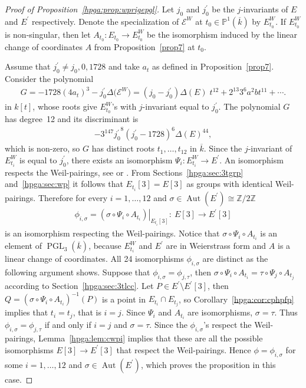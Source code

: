 \documentclass[11pt]{article}
\newcommand{\mpp}{{\mathbb{P}}}
\newcommand{\mzz}{{\mathbb{Z}}}
\newcommand{\msetp}[1]{{\left({#1}\right)}}					%
\newcommand{\msets}[1]{{\left[{#1}\right]}}					%
\newcommand{\maut}[1]{\operatorname{Aut}\msetp{#1}}			%
\newcommand{\mac}[1]{{\overline{#1}}}
\newcommand{\mpgl}[2]{{\operatorname{PGL}_{#1}}\msetp{#2}}	%
\newcommand{\mps}[2]{{\mpp^{#1}\msetp{#2}}}						%
\newcommand{\mres}[2]{{\left.{#1}\right|_{#2}}}					%
\numberwithin{equation}{section}
\begin{document}
\begin{proof}[Proof of Proposition~\ref{hpga:prop:wprigepgl}] Let $j_0$ and $j_0^\prime$ be the $j$-invariants of $E$ and $E^\prime$ respectively. Denote the specialization of $\mathcal{E}^W$ at $t_0\in\mps{1}{\mac {k}}$ by $E_{t_0}^W$. If $E_{t_0}^W$ is non-singular, then let $A_{t_0}\colon E_{t_0} \rightarrow E_{t_0}^W$ be the isomorphism induced by the linear change of coordinates $A$ from Proposition~\ref{prop7} at $t_0$.

Assume that $j_0^\prime\neq j_0,0,1728$ and take $a_t$ as defined in Proposition~\ref{prop7}. Consider the polynomial
\begin{gather*}
G=-1728\msetp{4a_t}^3-j_0^\prime \Delta\big(\mathcal{E}^W\big) =\msetp{j_0-j_0^\prime}\Delta\msetp{E}\;t^{12}+2^{13}3^6a^2b t^{11}+\cdots.
\end{gather*}
in $k\msets{t}$, whose roots give $E_{t_0}^W$'s with $j$-invariant equal to $j_0^\prime$. The polynomial $G$ has degree~12 and its discriminant is
\begin{gather*}
-3^{147}{j_0^\prime}^8\msetp{j_0^\prime-1728}^6\Delta\msetp{E}^{44},
\end{gather*}
which is non-zero, so $G$ has distinct roots $t_1,\ldots,t_{12}$ in $\mac{k}$. Since the $j$-invariant of $E_{t_i}^W$ is equal to $j_0^\prime$, there exists an isomorphism $\Psi_i\colon E_{t_i}^W\rightarrow E^\prime$. An isomorphism respects the Weil-pairings, see \cite[Proposition~III.8.2]{silverman1985} or \cite[Theorem~3.9]{washington2008}. From Sections~\ref{hpga:sec:3tgrp} and~\ref{hpga:sec:wp} it follows that $E_{t_i} \msets{3}=E\msets{3}$ as groups with identical Weil-pairings. Therefore for every $i=1,\ldots,12$ and $\sigma\in\maut{E^\prime}\cong\mzz/2\mzz$
\begin{gather*}
\phi_{i,\sigma} =\mres{\msetp{\sigma\circ\Psi_i\circ A_{t_i}}}{E_{t_i}\msets{3}}\colon \ E\msets{3} \rightarrow E^\prime\msets{3}
\end{gather*}
is an isomorphism respecting the Weil-pairings. Notice that $\sigma\circ\Psi_i \circ A_{t_i}$ is an element of $\mpgl{3}{\mac{k}}$, because $E_{t_i}^W$ and $E^\prime$ are in Weierstrass form and $A$ is a linear change of coordinates. All 24 isomorphisms $\phi_{i,\sigma}$ are distinct as the following argument shows. Suppose that $\phi_{i,\sigma}=\phi_{j,\tau}$, then $\sigma\circ\Psi_i\circ A_{t_i}=\tau\circ\Psi_j\circ A_{t_j}$ according to Section~\ref{hpga:sec:3tlcc}. Let $P\in E^\prime\setminus E^\prime\msets{3}$, then $Q=\msetp{\sigma\circ\Psi_i \circ A_{t_i}}^{-1}\msetp{P}$ is a point in $E_{t_i}\cap E_{t_j}$, so Corollary~\ref{hpga:cor:cphpfp} implies that $t_i=t_j$, that is $i=j$. Since $\Psi_i$ and $A_{t_i}$ are isomorphisms, $\sigma=\tau$. Thus $\phi_{i,\sigma}=\phi_{j,\tau}$ if and only if $i=j$ and $\sigma=\tau$. Since the $\phi_{i,\sigma}$'s respect the Weil-pairings, Lemma~\ref{hpga:lem:cwpi} implies that these are all the possible isomorphisms $E\msets{3}\rightarrow E^\prime\msets{3}$ that respect the Weil-pairings. Hence $\phi=\phi_{i,\sigma}$ for some $i=1,\ldots,12$ and $\sigma\in\maut{E^\prime}$, which proves the proposition in this case.


\end{proof}
\end{document}

